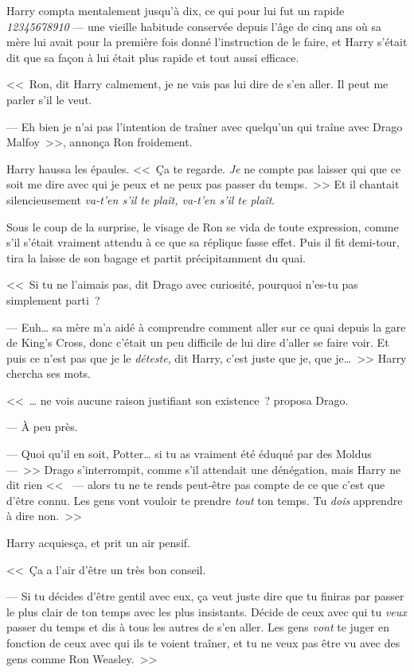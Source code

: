 Harry compta mentalement jusqu'à dix, ce qui pour lui fut un rapide \emph{12345678910} — une vieille habitude conservée depuis l'âge de cinq ans où sa mère lui avait pour la première fois donné l'instruction de le faire, et Harry s'était dit que sa façon à lui était plus rapide et tout aussi efficace.

<<~Ron, dit Harry calmement, je ne vais pas lui dire de s'en aller. Il peut me parler s'il le veut.

--- Eh bien je n'ai pas l'intention de traîner avec quelqu'un qui traîne avec Drago Malfoy~>>, annonça Ron froidement.

Harry haussa les épaules. <<~Ça te regarde. \emph{Je} ne compte pas laisser qui que ce soit me dire avec qui je peux et ne peux pas passer du temps.~>> Et il chantait silencieusement \emph{va-t'en s'il te plaît, va-t'en s'il te plaît}.

Sous le coup de la surprise, le visage de Ron se vida de toute expression, comme s'il s'était vraiment attendu à ce que sa réplique fasse effet. Puis il fit demi-tour, tira la laisse de son bagage et partit précipitamment du quai.

<<~Si tu ne l'aimais pas, dit Drago avec curiosité, pourquoi n'es-tu pas simplement parti~?

--- Euh… sa mère m'a aidé à comprendre comment aller sur ce quai depuis la gare de King's Cross, donc c'était un peu difficile de lui dire d'aller se faire voir. Et puis ce n'est pas que je le \emph{déteste}, dit Harry, c'est juste que je, que je…~>> Harry chercha ses mots.

<<~… ne vois aucune raison justifiant son existence~? proposa Drago.

--- À peu près.

--- Quoi qu'il en soit, Potter… si tu as vraiment été éduqué par des Moldus —~>> Drago s'interrompit, comme s'il attendait une dénégation, mais Harry ne dit rien <<~ — alors tu ne te rends peut-être pas compte de ce que c'est que d'être connu. Les gens vont vouloir te prendre \emph{tout} ton temps. Tu \emph{dois} apprendre à dire non.~>>

Harry acquiesça, et prit un air pensif.

<<~Ça a l'air d'être un très bon conseil.

--- Si tu décides d'être gentil avec eux, ça veut juste dire que tu finiras par passer le plus clair de ton temps avec les plus insistants. Décide de ceux avec qui tu \emph{veux} passer du temps et dis à tous les autres de s'en aller. Les gens \emph{vont} te juger en fonction de ceux avec qui ils te voient traîner, et tu ne veux pas être vu avec des gens comme Ron Weasley.~>>

